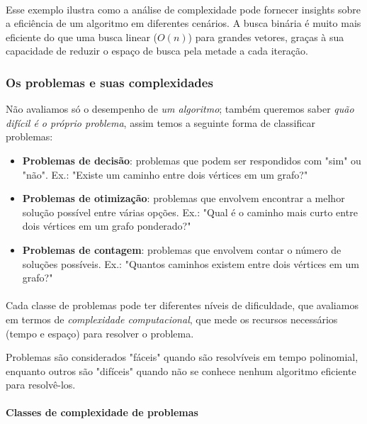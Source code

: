 \documentclass[12pt,a4paper]{article}
\begin{document}
\paragraph{}
Esse exemplo ilustra como a análise de complexidade pode fornecer insights sobre a eficiência de um algoritmo em diferentes cenários. A busca binária é muito mais eficiente do que uma busca linear (\(O(n)\)) para grandes vetores, graças à sua capacidade de reduzir o espaço de busca pela metade a cada iteração.

\subsubsection{Os problemas e suas complexidades}

Não avaliamos só o desempenho de \emph{um algoritmo}; também queremos saber \emph{quão difícil é o próprio problema}, assim temos  a seguinte forma de classificar problemas:    
\begin{itemize}\setlength{\itemsep}{2pt}
    \item \textbf{Problemas de decisão}: problemas que podem ser respondidos com "sim" ou "não". Ex.: "Existe um caminho entre dois vértices em um grafo?"
    \item \textbf{Problemas de otimização}: problemas que envolvem encontrar a melhor solução possível entre várias opções. Ex.: "Qual é o caminho mais curto entre dois vértices em um grafo ponderado?"
    \item \textbf{Problemas de contagem}: problemas que envolvem contar o número de soluções possíveis. Ex.: "Quantos caminhos existem entre dois vértices em um grafo?"
\end{itemize}

\paragraph{}
Cada classe de problemas pode ter diferentes níveis de dificuldade, que avaliamos em termos de \emph{complexidade computacional}, que mede os recursos necessários (tempo e espaço) para resolver o problema.

Problemas são considerados "fáceis" quando são resolvíveis em tempo polinomial, enquanto outros são "difíceis" quando não se conhece nenhum algoritmo eficiente para resolvê-los.

\paragraph{Classes de complexidade de problemas}
\end{document}
